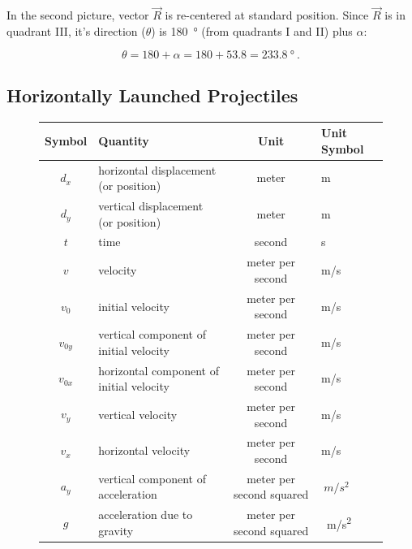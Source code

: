 \documentclass[main.tex]{subfiles}
\begin{document}
In the second picture, vector $\vec{R}$ is re-centered at standard position. Since $\vec{R}$ is in quadrant III, it's direction ($\theta$) is \SI{180}{\degree} (from quadrants I and II) plus $\alpha$:

\begin{equation*}
    \theta = 180 + \alpha = 180 + 53.8 = \SI{233.8}{\degree}\ .
\end{equation*}


\subsection{Horizontally Launched Projectiles}

\begin{figure}[h!]
    \centering
    \begin{tabular}{cl|cl}
    \hline
    \textbf{Symbol} & \textbf{Quantity} & \textbf{Unit} & \textbf{Unit Symbol}  \\
    \hline\hline
        $d_x$ & horizontal displacement (or position) & meter & m\\
        $d_y$ & vertical displacement (or position) & meter & m\\
        $t$ & time & second & s\\
        $v$ & velocity & meter per second & m/s\\
        $v_0$ & initial velocity & meter per second & m/s\\
        $v_{0y}$ & vertical component of initial velocity & meter per second & m/s\\
        $v_{0x}$ & horizontal component of initial velocity & meter per second & m/s\\
        $v_y$ & vertical velocity & meter per second & m/s\\
        $v_x$ & horizontal velocity & meter per second & m/s\\
        $a_y$ & vertical component of acceleration & meter per second squared & $\SI{}{m/s^2}$\\
        $g$ & acceleration due to gravity & meter per second squared & \SI{}{m/s^2}\\
    \hline
    \end{tabular}
    \label{fig:my_label}
\end{figure}
\end{document}
